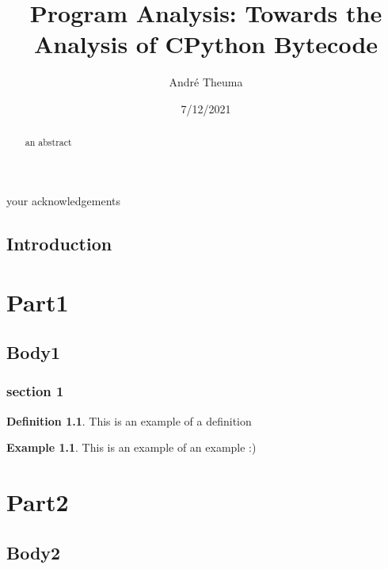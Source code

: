 \documentclass[12pt, a4paper]{report}
\theoremstyle{definition}
\newtheorem{definition}{Definition}[section]
\theoremstyle{definition}%
\newtheorem{example}{Example}[section]
\theoremstyle{definition}%
\theoremstyle{definition}%
\theoremstyle{definition}%
\theoremstyle{definition}%
\begin{document}
\title{Program Analysis: Towards the Analysis of CPython Bytecode}
\author{André Theuma}
\date{7/12/2021}

\frontmatter

\begin{acknowledgements}
your acknowledgements
\end{acknowledgements}
       
\begin{abstract}
an abstract
\end{abstract}

\tableofcontents

\listoffigures

\listoftables



\mainmatter

\chapter{Introduction}
\part{Part1}
\chapter{Body1}

\section{section 1}

\begin{definition}
This is an example of a definition
\end{definition}

\begin{example}
This is an example of an example :)
\end{example}




\part{Part2}
\chapter{Body2}
\end{document}
